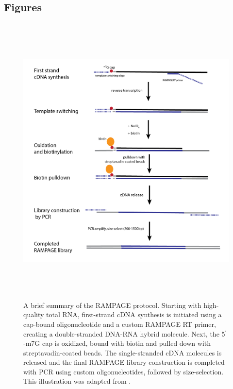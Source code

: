 \documentclass[runningheads,a4paper]{llncs}
\begin{document}
\begin{linenumbers}
\subsection{Figures}

\begin{figure}
\centering
\includegraphics[height=15cm]{Figures/Insect_Chapter_Figure_1}
\caption{A brief summary of the RAMPAGE protocol. Starting with high-quality total RNA, first-strand cDNA synthesis is initiated using a cap-bound oligonucleotide and a custom RAMPAGE RT primer, creating a double-stranded DNA-RNA hybrid molecule. Next, the 5$^\prime$-m7G cap is oxidized, bound with biotin and pulled down with streptavadin-coated beads. The single-stranded cDNA molecules is released and the final RAMPAGE library construction is completed with PCR using custom oligonucleotides, followed by size-selection. This illustration was adapted from \cite{Batut:2013fu}.}
\label{fig:figure1}
\end{figure}


\end{linenumbers}
\end{document}
